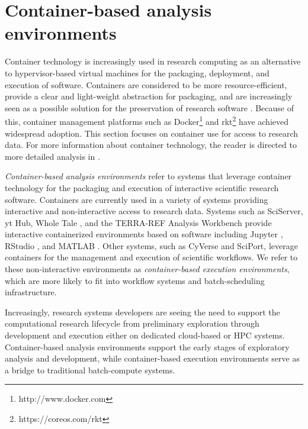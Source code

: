 \documentclass{sig-alternate}
\begin{document}

\section{Container-based analysis environments}

Container technology is increasingly used in research computing as an alternative to hypervisor-based virtual machines for the packaging, deployment, and execution of software. Containers are considered to be more resource-efficient, provide a clear and light-weight abstraction for packaging, and are increasingly seen as a possible solution for the preservation of research software \cite{Meng2015137}.  Because of this, container management platforms such as Docker\footnote{\small http://www.docker.com} and rkt\footnote{\small https://coreos.com/rkt} have achieved widespread adoption. This section focuses on container use for access to research data. For more information about container technology, the reader is directed to more detailed analysis in \cite{7036275,7095802,Soltesz:2007:COS:1272998.1273025}. 

\emph{Container-based analysis environments} refer to systems that leverage container technology for the packaging and execution of interactive scientific research software. Containers are currently used in a variety of systems providing interactive and non-interactive access to research data. Systems such as SciServer, yt Hub, Whole Tale \cite{ludaescher2016capturing}, and the TERRA-REF Analysis Workbench provide interactive containerized environments based on software including Jupyter \cite{kluyver2016jupyter}, RStudio \cite{Rstudio2015}, and MATLAB \cite{mathworks}. Other systems, such as CyVerse\cite{devisetty2016bringing} and SciPort\cite{Gerlach:2014:SCE:2689676.2689680}, leverage containers for the management and execution of scientific workflows. We refer to these non-interactive environments as \emph{container-based execution environments}, which are more likely to fit into workflow systems and batch-scheduling infrastructure.  

Increasingly, research systems developers are seeing the need to support the computational research lifecycle from preliminary exploration through development and execution either on dedicated cloud-based or HPC systems. Container-based analysis environments support the early stages of exploratory analysis and development, while container-based execution environments serve as a bridge to traditional batch-compute systems.
\end{document}
